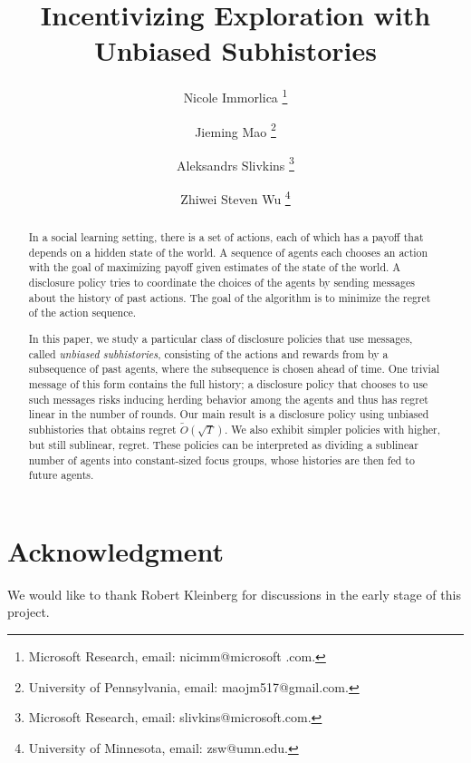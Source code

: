 \documentclass[11pt]{article}
\title{Incentivizing Exploration with Unbiased Subhistories}
\author{
Nicole Immorlica \thanks{Microsoft Research, email: nicimm@microsoft	.com.}
\and
Jieming Mao \thanks{University of Pennsylvania, email: maojm517@gmail.com.}
\and
Aleksandrs Slivkins  \thanks{Microsoft Research, email: slivkins@microsoft.com.}
\and
Zhiwei Steven Wu  \thanks{University of Minnesota, email: zsw@umn.edu.}
}
\begin{document}
\begin{titlepage}
\maketitle

\thispagestyle{empty}
\begin{abstract}
In a social learning setting, there is a set of actions, each of which has a payoff that depends on a hidden state of the world. A sequence of agents each chooses an action with the goal of maximizing payoff given estimates of the state of the world.  A disclosure policy tries to coordinate the choices of the agents by sending messages about the history of past actions.  The goal of the algorithm is to minimize the regret of the action sequence.

In this paper, we study a particular class of disclosure policies that use messages, called {\em unbiased subhistories}, consisting of the actions and rewards from by a subsequence of past agents, where the subsequence is chosen ahead of time. One trivial message of this form contains the full history; a disclosure policy that chooses to use such messages risks inducing herding behavior among the agents and thus has regret linear in the number of rounds.  Our main result is a disclosure policy using unbiased subhistories that obtains regret $\tilde{O}(\sqrt{T})$.  We also exhibit simpler policies with higher, but still sublinear, regret.  These policies can be interpreted as dividing a sublinear number of agents into constant-sized focus groups, whose histories are then fed to future agents.
\end{abstract}
\end{titlepage}




%










\section*{Acknowledgment}
We would like to thank Robert Kleinberg for discussions in the early stage of this project.

\appendix





%
\end{document}
